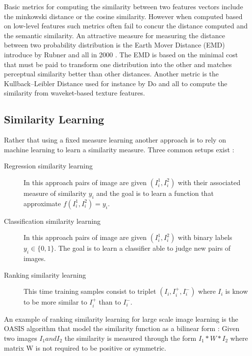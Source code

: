       Basic metrics for computing the similarity between two features vectors include the minkowski distance or the cosine similarity. However when computed based on low-level features such metrics often fail to concur the distance computed and the semantic similarity. An attractive measure for measuring the distance between two probability distribution is the Earth Mover Distance (EMD) introduce by Rubner and all in 2000 \cite{rubner2000earth}. The EMD is based on the minimal cost that must be paid to transform one distribution into the other and matches perceptual similarity better than other distances. Another metric is the Kullback–Leibler Distance used for instance by Do and all \cite{do2002wavelet} to compute the similarity from waveket-based texture features.

      \subsection{Similarity Learning}

        Rather that using a fixed measure learning another approach is to rely on machine learning to learn a similarity measure. Three common setups exist :

        \begin{description}
          \item[Regression similarity learning] In this approach pairs of image are given \( (I_i^1, I_i^2 ) \) with their associated measure of similarity \( y_i \) and the goal is to learn a function that approximate \( f(I_i^1, I_i^2)  = y_i \).

          \item[Classification similarity learning] In this approach pairs of image are given \( (I_i^1, I_i^2 ) \) with binary labels \( y_i \in \{0, 1\} \). The goal is to learn a classifier able to judge new pairs of images.

          \item[Ranking similarity learning] This time training samples consist to triplet \( (I_i, I_i^+, I_i^-) \) where \( I_i \) is know to be more similar to \( I_i^+\) than to  \( I_i^-\).

        \end{description}

        An example of ranking similarity learning for large scale image learning is the OASIS algorithm \cite{chechik2010large} that model the similarity function as a bilinear form : Given two images \( I_1 and I_2 \) the similarity is measured through the form \( I_1*W*I_2 \) where matrix W is not required to be positive or symmetric.

